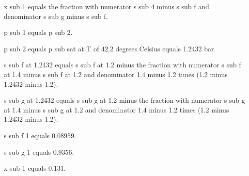 x sub 1 equals the fraction with numerator s sub 4 minus s sub f and denominator s sub g minus s sub f.

p sub 1 equals p sub 2.

p sub 2 equals p sub sat at T of 42.2 degrees Celsius equals 1.2432 bar.

s sub f at 1.2432 equals s sub f at 1.2 minus the fraction with numerator s sub f at 1.4 minus s sub f at 1.2 and denominator 1.4 minus 1.2 times (1.2 minus 1.2432 minus 1.2).

s sub g at 1.2432 equals s sub g at 1.2 minus the fraction with numerator s sub g at 1.4 minus s sub g at 1.2 and denominator 1.4 minus 1.2 times (1.2 minus 1.2432 minus 1.2).

s sub f 1 equals 0.08959.

s sub g 1 equals 0.9356.

x sub 1 equals 0.131.